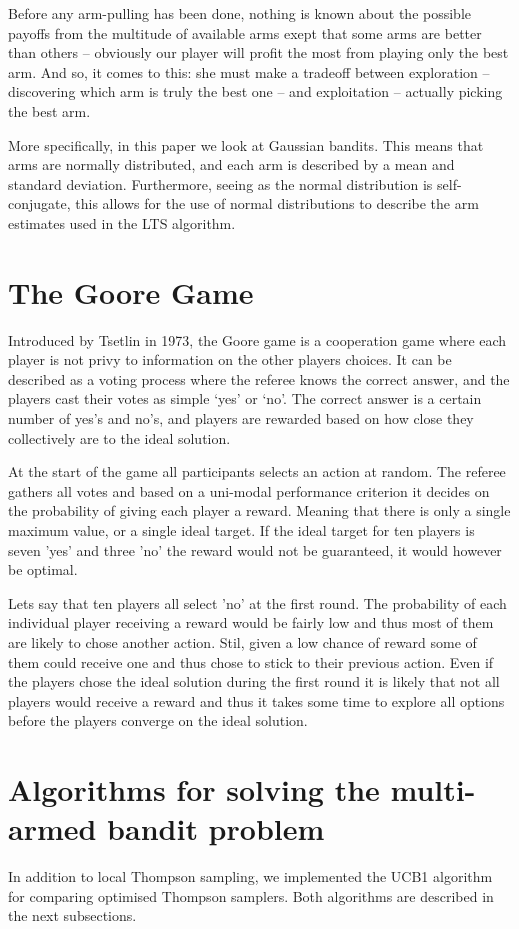 Before any arm-pulling has been done, nothing is known about the possible 
payoffs from the multitude of available arms exept that some arms are better 
than others -- obviously our player will profit the most from playing only the 
best arm. And so, it comes to this: she must make a tradeoff between exploration 
-- discovering which arm is truly the best one -- and exploitation -- actually 
picking the best arm.

More specifically, in this paper we look at Gaussian bandits.
This means that arms are normally distributed, and each arm is described by a mean and standard deviation.
Furthermore, seeing as the normal distribution is self-conjugate, this allows for the
use of normal distributions to describe the arm estimates used in the LTS algorithm.

\section{The Goore Game}
Introduced by Tsetlin in 1973, the Goore game is a cooperation game where each  
player is not privy to information on the other players choices. It can be 
described as a voting process where the referee knows the correct answer, and 
the players cast their votes as simple ‘yes’ or ‘no’. The correct answer is a 
certain number of yes’s and no’s, and players are rewarded based on how close 
they collectively are to the ideal solution.

At the start of the game all participants selects an action at random. The referee
gathers all votes and based on a uni-modal performance criterion it decides on
the probability of giving each player a reward. Meaning that there is only a single
maximum value, or a single ideal target. If the ideal target for ten players is
seven 'yes' and three 'no' the reward would not be guaranteed, it would however be
optimal. 

Lets say that ten players all select 'no' at the first round. The probability of
each individual player receiving a reward would be fairly low and thus most of them
are likely to chose another action. Stil, given a low chance of reward some of them
could receive one and thus chose to stick to their previous action. Even if the players
chose the ideal solution during the first round it is likely that not all players would
receive a reward and thus it takes some time to explore all options before the players
converge on the ideal solution.

\section{Algorithms for solving the multi-armed bandit problem}
In addition to local Thompson sampling, we implemented the UCB1 algorithm for 
comparing optimised Thompson samplers. Both algorithms are described in the next 
subsections.


